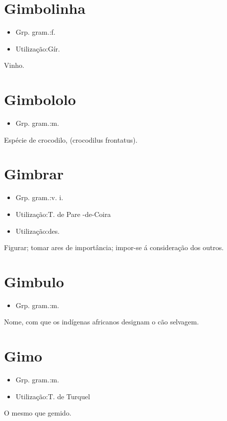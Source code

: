 \section{Gimbolinha}
\begin{itemize}
\item {Grp. gram.:f.}
\end{itemize}
\begin{itemize}
\item {Utilização:Gír.}
\end{itemize}
Vinho.
\section{Gimbololo}
\begin{itemize}
\item {Grp. gram.:m.}
\end{itemize}
Espécie de crocodilo, (\textunderscore crocodilus frontatus\textunderscore ).
\section{Gimbrar}
\begin{itemize}
\item {Grp. gram.:v. i.}
\end{itemize}
\begin{itemize}
\item {Utilização:T. de Pare -de-Coira}
\end{itemize}
\begin{itemize}
\item {Utilização:des.}
\end{itemize}
Figurar; tomar ares de importância; impor-se á consideração dos outros.
\section{Gimbulo}
\begin{itemize}
\item {Grp. gram.:m.}
\end{itemize}
Nome, com que os indígenas africanos designam o cão selvagem.
\section{Gimo}
\begin{itemize}
\item {Grp. gram.:m.}
\end{itemize}
\begin{itemize}
\item {Utilização:T. de Turquel}
\end{itemize}
O mesmo que \textunderscore gemido\textunderscore .
